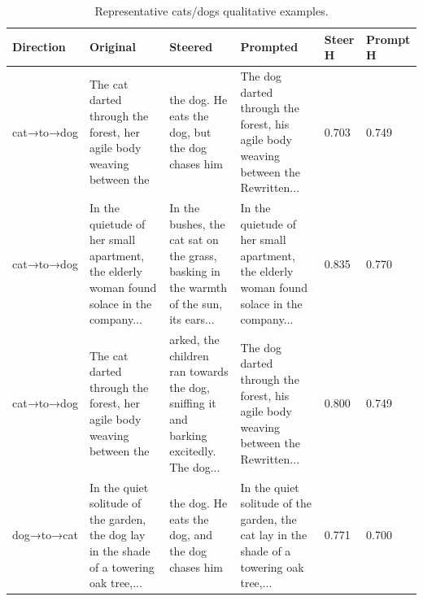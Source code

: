 \begin{table}[t]
\centering
\small
\begin{tabular}{llllll}
\toprule
Direction & Original & Steered & Prompted & Steer H & Prompt H \\
\midrule
cat→to→dog & The cat darted through the forest, her agile body weaving between the & the dog. He eats the dog, but the dog chases him & The dog darted through the forest, his agile body weaving between the Rewritten... & 0.703 & 0.749 \\
cat→to→dog & In the quietude of her small apartment, the elderly woman found solace in the company... & In the bushes, the cat sat on the grass, basking in the warmth of the sun, its ears... & In the quietude of her small apartment, the elderly woman found solace in the company... & 0.835 & 0.770 \\
cat→to→dog & The cat darted through the forest, her agile body weaving between the & arked, the children ran towards the dog, sniffing it and barking excitedly. The dog... & The dog darted through the forest, his agile body weaving between the Rewritten... & 0.800 & 0.749 \\
dog→to→cat & In the quiet solitude of the garden, the dog lay in the shade of a towering oak tree,... & the dog. He eats the dog, and the dog chases him & In the quiet solitude of the garden, the cat lay in the shade of a towering oak tree,... & 0.771 & 0.700 \\
\bottomrule
\end{tabular}
\caption{Representative cats/dogs qualitative examples.}
\label{tab:qual-examples}
\end{table}
